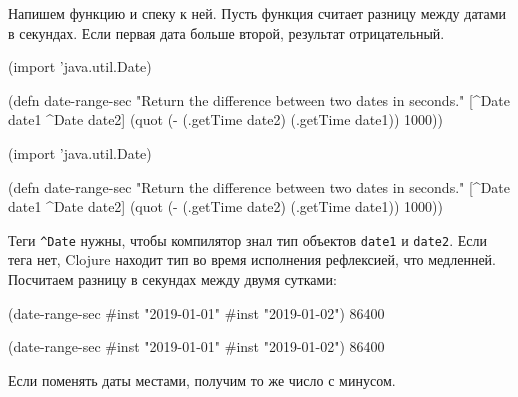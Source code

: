 
Напишем функцию и спеку к ней. Пусть функция считает разницу между датами в
секундах. Если первая дата больше второй, результат отрицательный.

\ifx\DEVICETYPE\MOBILE

\begin{english}
  \begin{clojure}
(import 'java.util.Date)

(defn date-range-sec
  "Return the difference
           between two dates in seconds."
  [^Date date1 ^Date date2]
  (quot (- (.getTime date2)
           (.getTime date1))
        1000))
  \end{clojure}
\end{english}

\else

\begin{english}
  \begin{clojure}
(import 'java.util.Date)

(defn date-range-sec
  "Return the difference between two dates in seconds."
  [^Date date1 ^Date date2]
  (quot (- (.getTime date2)
           (.getTime date1))
        1000))
  \end{clojure}
\end{english}

\fi

Теги \verb|^Date| нужны, чтобы компилятор знал тип объектов \verb|date1| и
\verb|date2|. Если тега нет, Clojure находит тип во время исполнения
рефлексией, что медленней. Посчитаем разницу в секундах между двумя сутками:

\ifx\DEVICETYPE\MOBILE

\begin{english}
  \begin{clojure}
(date-range-sec #inst "2019-01-01"
                #inst "2019-01-02")
86400
  \end{clojure}
\end{english}

\else

\begin{english}
  \begin{clojure}
(date-range-sec #inst "2019-01-01" #inst "2019-01-02")
86400
  \end{clojure}
\end{english}

\fi

\noindent
Если поменять даты местами, получим то же число с минусом.

